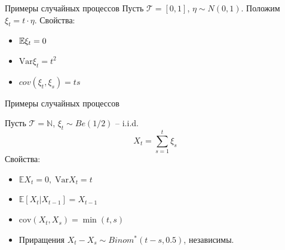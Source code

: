 \documentclass[aspectratio=169]{beamer}
\begin{document}
\begin{frame}{Примеры случайных процессов}
    Пусть $\mathcal{T}=[0,1]$, $\eta \sim N(0,1)$. Положим $\xi_t = t \cdot \eta$.
    Свойства:
    \begin{itemize}
        \item $\mathbb{E} \xi_t = 0$
        \item $\mathrm{Var} \xi_t = t^2$
        \item $cov(\xi_t, \xi_s) = ts$
    \end{itemize}
    

    \noindent{}
\end{frame}

\begin{frame}{Примеры случайных процессов}

    Пусть $\mathcal{T}=\mathbb{N}$, $\xi_t \sim Be(1/2)$ -- i.i.d.
    $$X_t = \sum_{s=1}^{t} \xi_s$$     
    Свойства:
    \begin{itemize}
        \item $\mathbb{E} X_t = 0, \; \mathrm{Var} X_t = t$
        \item $\mathbb{E} \left[ X_t | X_{t-1} \right] = X_{t-1}$
        \item $\mathrm{cov}(X_t, X_s) = \min(t, s)$
        \item Приращения $X_t - X_s \sim Binom^*(t-s, 0.5)$, независимы.
    \end{itemize}

\end{frame}
\end{document}
